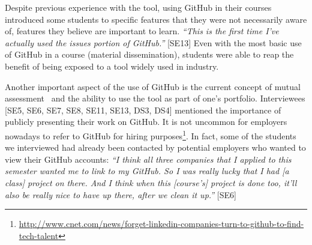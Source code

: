 Despite previous experience with the tool, using GitHub in their courses introduced some students to specific features that they were not necessarily aware of, features they believe are important to learn. \textit{``This is the first time I've actually used the issues portion of GitHub.''} [SE13] Even with the most basic use of GitHub in a course (material dissemination), students were able to reap the benefit of being exposed to a tool widely used in industry.


%
Another important aspect of the use of GitHub is the current concept of mutual assessment~\cite{Singer2013} and the ability to use the tool as part of one's portfolio. Interviewees [SE5, SE6, SE7, SE8, SE11, SE13, DS3, DS4] mentioned the importance of publicly presenting their work on GitHub. It is not uncommon for employers nowadays to refer to GitHub for hiring purposes\footnote{\url{http://www.cnet.com/news/forget-linkedin-companies-turn-to-github-to-find-tech-talent}}. In fact, some of the students we interviewed had already been contacted by potential employers who wanted to view their GitHub accounts: \textit{``I think all three companies that I applied to this semester wanted me to link to my GitHub. So I was really lucky that I had [a class] project on there. And I think when this [course's] project is done too, it'll also be really nice to have up there, after we clean it up.''} [SE6]

